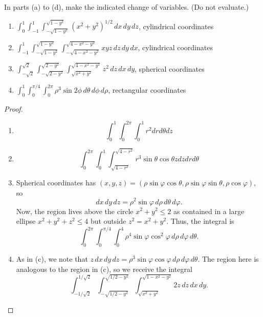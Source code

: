 \documentclass[openany]{book}
\begin{document}
\begin{prob}[4]
    In parts (a) to (d), make the indicated change of variables. (Do not evaluate.)

    \begin{enumerate}
        \item[(a)] \(\displaystyle \int_{0}^{1} \int_{-1}^{1} \int_{-\sqrt{1-y^2}}^{\sqrt{1-y^2}} (x^2 + y^2)^{1/2} \, dx \, dy \, dz\), cylindrical coordinates
        \item[(b)] \(\displaystyle \int_{-1}^{1} \int_{-\sqrt{1-y^2}}^{\sqrt{1-y^2}} \int_{-\sqrt{4-x^2-y^2}}^{\sqrt{4-x^2-y^2}} xyz \, dz \, dy \, dx\), cylindrical coordinates
        \item[(c)] \(\displaystyle \int_{-\sqrt{2}}^{\sqrt{2}} \int_{-\sqrt{2-y^2}}^{\sqrt{2-y^2}} \int_{\sqrt{x^2+y^2}}^{\sqrt{4-x^2-y^2}} z^2 \, dz \, dx \, dy\), spherical coordinates
        \item[(d)] \(\displaystyle \int_{0}^{1} \int_{0}^{\pi/4} \int_{0}^{2\pi} \rho^3 \sin 2\phi \, d\theta \, d\phi \, d\rho\), rectangular coordinates
    \end{enumerate}
\end{prob}
\begin{proof}
    \begin{enumerate}
        \item[(a)] 
        \begin{equation*}
            \int_0^1\int_0^{2\pi}\int_{0}^1r^2drd\theta dz
        \end{equation*}
        \item[(b)]
        \begin{equation*}
            \int_0^{2\pi}\int_0^1\int_{\sqrt{4-r^2}}^{\sqrt{4-r^2}}r^3\sin\theta\cos\theta zdzdrd\theta
        \end{equation*}
        \item[(c)] Spherical coordinates has $(x,y,z)=(\rho\sin\varphi\cos\theta,\rho\sin\varphi\sin\theta,\rho\cos\varphi)$, so
        \[dx\,dy\,dz=\rho^2\sin\varphi\,d\rho\,d\theta\,d\varphi.\]
        Now, the region lives above the circle $x^2+y^2\le2$ as contained in a large ellipse $x^2+y^2+z^2\le4$ but outside $z^2=x^2+y^2$. Thus, the integral is
        \[\int_0^{2\pi}\int_0^{\pi/4}\int_0^4\rho^4\sin\varphi\cos^2\varphi\,d\rho\,d\varphi\,d\theta.\]
        \item[(d)] As in (c), we note that $z\,dx\,dy\,dz=\rho^3\sin\varphi\cos\varphi\,d\rho\,d\varphi\,d\theta$. The region here is analogous to the region in (c), so we receive the integral
        \[\int_{-1/\sqrt{2}}^{1/\sqrt{2}} \int_{-\sqrt{1/2-y^2}}^{\sqrt{1/2-y^2}} \int_{\sqrt{x^2+y^2}}^{\sqrt{1-x^2-y^2}} 2z \, dz \, dx \, dy.\]
    \end{enumerate}
\end{proof}
\end{document}
